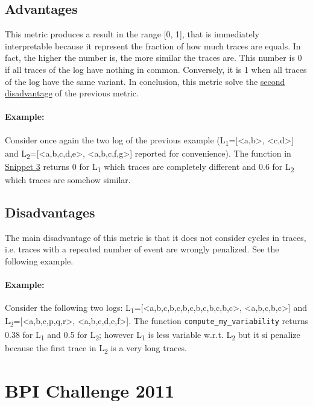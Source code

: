 \documentclass[12pt]{article}
\begin{document}
\subsection*{Advantages}

This metric produces a result in the range [0, 1], that is immediately interpretable because it represent the fraction of how much traces are equals. In fact, the higher the number is, the
more similar the traces are. This number is 0 if all traces of the log have nothing in common. Conversely, it is 1 when all traces of the log have the same variant. In conclusion, this metric solve the \hyperref[ref:cons2]{second disadvantage} of the previous metric.

\paragraph*{Example:} Consider once again the two log of the previous example (L\textsubscript{1}=[\textless a,b\textgreater, \textless c,d\textgreater] and L\textsubscript{2}=[\textless a,b,c,d,e\textgreater, \textless a,b,c,f,g\textgreater] reported for convenience). The function in \hyperref[code:code3]{Snippet 3} returns 0 for L\textsubscript{1} which traces are completely different and 0.6 for L\textsubscript{2} which traces are somehow similar.

\subsection*{Disadvantages}

The main disadvantage of this metric is that it does not consider cycles in traces, i.e. traces with a repeated number of event are wrongly penalized. See the following example.

\paragraph*{Example:} Consider the following two logs: L\textsubscript{1}=[\textless a,b,c,b,c,b,c,b,c,b,c,b,c\textgreater, \textless a,b,c,b,c\textgreater] and L\textsubscript{2}=[\textless a,b,c,p,q,r\textgreater, \textless a,b,c,d,e,f\textgreater]. The function \texttt{compute\_my\_variability} returns 0.38 for L\textsubscript{1} and 0.5 for L\textsubscript{2}; however L\textsubscript{1} is less variable w.r.t. L\textsubscript{2} but it si penalize because the first trace in L\textsubscript{2} is a very long traces.

\section*{BPI Challenge 2011}\label{section:results}
\end{document}
